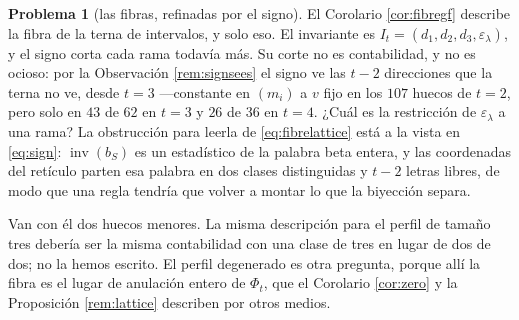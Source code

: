 \documentclass[11pt,reqno]{amsart}
\theoremstyle{plain}
\theoremstyle{definition}
\newtheorem{problem}[theorem]{Problema}
\newcommand{\inv}{\operatorname{inv}}
\begin{document}
\begin{problem}[las fibras, refinadas por el signo]\label{prob:fibres}
El Corolario \ref{cor:fibregf} describe la fibra de la terna de intervalos, y solo eso. El
invariante es $I_t=(d_1,d_2,d_3,\varepsilon_\lambda)$, y el signo corta cada rama todavía más. Su
corte no es contabilidad, y no es ocioso: por la Observación \ref{rem:signsees} el signo ve las
$t-2$ direcciones que la terna no ve, desde $t=3$ ---constante en $(m_i)$ a $v$ fijo en los $107$
huecos de $t=2$, pero solo en $43$ de $62$ en $t=3$ y $26$ de $36$ en $t=4$. ¿Cuál es la
restricción de $\varepsilon_\lambda$ a una rama? La obstrucción para leerla de
\eqref{eq:fibrelattice} está a la vista en \eqref{eq:sign}: $\inv(b_S)$ es un estadístico de la
palabra beta entera, y las coordenadas del retículo parten esa palabra en dos clases distinguidas y
$t-2$ letras libres, de modo que una regla tendría que volver a montar lo que la biyección separa.

Van con él dos huecos menores. La misma descripción para el perfil de tamaño tres debería ser la
misma contabilidad con una clase de tres en lugar de dos de dos; no la hemos escrito. El perfil
degenerado es otra pregunta, porque allí la fibra es el lugar de anulación entero de $\Phi_t$, que
el Corolario \ref{cor:zero} y la Proposición \ref{rem:lattice} describen por otros medios.
\end{problem}
\end{document}
